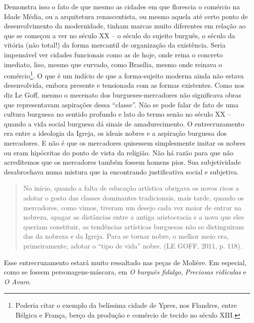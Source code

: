 Demonstra isso o fato de que mesmo as cidades em que florescia o
comércio na Idade Média, ou a arquitetura renascentista, ou mesmo aquela
até certo ponto de desenvolvimento da modernidade, tinham marcas muito
diferentes em relação ao que se começou a ver no século XX -- o século
do sujeito burguês, o século da vitória (não total!) da forma mercantil
de organização da existência. Seria impensável ver cidades funcionais
como as de hoje, onde reina o concreto imediato, liso, mesmo que
curvado, como Brasília, mesmo onde reinava o comércio\footnote{Poderia
  citar o exemplo da belíssima cidade de Ypres, nos Flandres, entre
  Bélgica e França, berço da produção e comércio de tecido no século
  XIII.}. O que é um indício de que a forma-sujeito moderna ainda não
estava desenvolvida, embora presente e tensionada com as formas
existentes. Como nos diz Le Goff, mesmo o mecenato dos
burgueses-mercadores não significava obras que representavam aspirações
dessa ``classe''. Não se pode falar de fato de uma cultura burguesa no
sentido profundo e lato do termo senão no século XX -- quando a vida
social burguesa dá sinais de amadurecimento. O entrecruzamento era entre
a ideologia da Igreja, os ideais nobres e a aspiração burguesa dos
mercadores. E não é que os mercadores quisessem simplesmente imitar os
nobres ou eram hipócritas do ponto de vista da religião. Não há razão
para que não acreditemos que os mercadores também fossem homens pios.
Sua subjetividade desabrochava numa mistura que ia encontrando
justificativa social e subjetiva.

\begin{quote}
No início, quando a falta de educação artística obrigava os novos ricos
a adotar o gosto das classes dominantes tradicionais, mais tarde, quando
os mercadores, como vimos, tiveram um desejo cada vez maior de entrar na
nobreza, apagar as distâncias entre a antiga aristocracia e a nova que
eles queriam constituir, as tendências artísticas burguesas não se
distinguiram das da nobreza e da Igreja. Para se tornar nobre, o melhor
meio era, primeiramente, adotar o ``tipo de vida'' nobre. (LE GOFF,
2011, p. 118).
\end{quote}

Esse entrecruzamento estará muito ressaltado nas peças de Molière. Em
especial, como se fossem personagens-máscara, em \emph{O burguês
fidalgo}, \emph{Preciosas ridículas} e \emph{O Avaro}.

